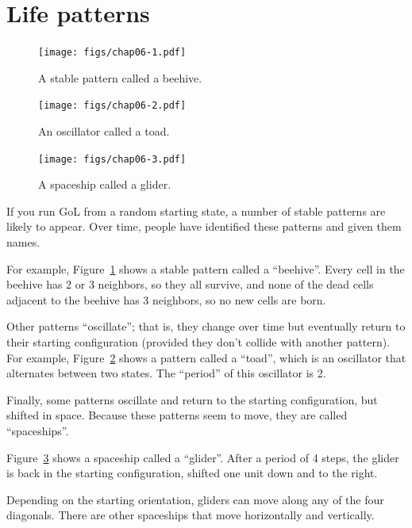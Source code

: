 \documentclass[12pt]{book}
\theoremstyle{exercise}
\begin{document}
\section{Life patterns}
\label{lifepatterns}

\begin{figure}
\centerline{\texttt{[image: figs/chap06-1.pdf]}}
\caption{A stable pattern called a beehive.}
\label{chap06-1}
\end{figure}

\begin{figure}
\centerline{\texttt{[image: figs/chap06-2.pdf]}}
\caption{An oscillator called a toad.}
\label{chap06-2}
\end{figure}

\begin{figure}
\centerline{\texttt{[image: figs/chap06-3.pdf]}}
\caption{A spaceship called a glider.}
\label{chap06-3}
\end{figure}

If you run GoL from a random starting state, a number of stable
patterns are likely to appear.  Over time, people have identified
these patterns and given them names.


For example, Figure~\ref{chap06-1} shows a stable pattern called a
``beehive''.  Every cell in the beehive
has 2 or 3 neighbors, so they all survive, and none of the dead
cells adjacent to the beehive has 3 neighbors, so no new cells
are born.

Other patterns ``oscillate''; that is, they change over time but
eventually return to their starting configuration (provided
they don't collide with another pattern).  For example,
Figure~\ref{chap06-2} shows a pattern called a ``toad'', which
is an oscillator that alternates between two states.  The
``period'' of this oscillator is 2.


Finally, some patterns oscillate and return to the starting
configuration, but shifted in space.  Because these patterns 
seem to move, they are called ``spaceships''.

Figure~\ref{chap06-3} shows a spaceship called a
``glider''.  After a period of 4 steps, the glider is back in the
starting configuration, shifted one unit down and to the right.


Depending on the starting orientation, gliders can move along any
of the four diagonals.  There are other spaceships that
move horizontally and vertically.
\end{document}
